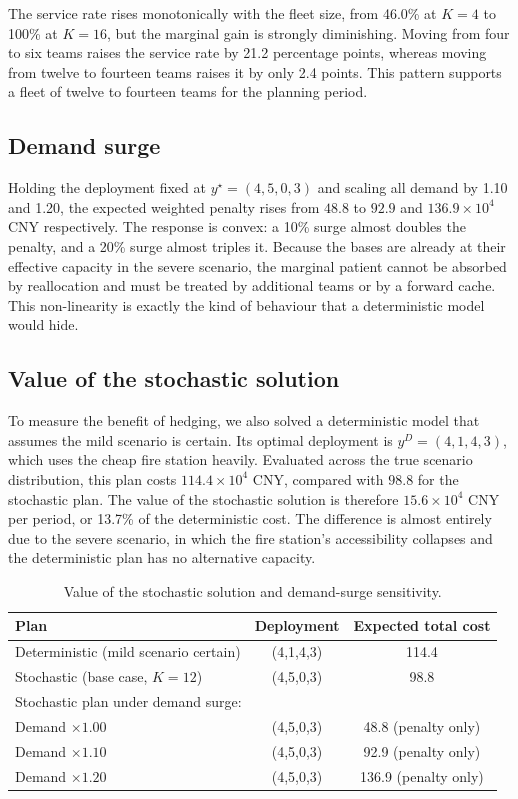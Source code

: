\documentclass{apmcmthesis}
\begin{document}
The service rate rises monotonically with the fleet size, from 46.0\% at $K=4$ to 100\% at $K=16$, but the marginal gain is strongly diminishing. Moving from four to six teams raises the service rate by 21.2 percentage points, whereas moving from twelve to fourteen teams raises it by only 2.4 points. This pattern supports a fleet of twelve to fourteen teams for the planning period.

\subsection{Demand surge}

Holding the deployment fixed at $y^{\star}=(4,5,0,3)$ and scaling all demand by 1.10 and 1.20, the expected weighted penalty rises from $48.8$ to $92.9$ and $136.9\times10^{4}$ CNY respectively. The response is convex: a 10\% surge almost doubles the penalty, and a 20\% surge almost triples it. Because the bases are already at their effective capacity in the severe scenario, the marginal patient cannot be absorbed by reallocation and must be treated by additional teams or by a forward cache. This non-linearity is exactly the kind of behaviour that a deterministic model would hide.

\subsection{Value of the stochastic solution}

To measure the benefit of hedging, we also solved a deterministic model that assumes the mild scenario is certain. Its optimal deployment is $y^{D}=(4,1,4,3)$, which uses the cheap fire station heavily. Evaluated across the true scenario distribution, this plan costs $114.4\times10^{4}$ CNY, compared with $98.8$ for the stochastic plan. The value of the stochastic solution is therefore $15.6\times10^{4}$ CNY per period, or 13.7\% of the deterministic cost. The difference is almost entirely due to the severe scenario, in which the fire station's accessibility collapses and the deterministic plan has no alternative capacity.

\begin{table}[!ht]
\centering
\caption{Value of the stochastic solution and demand-surge sensitivity.}
\label{tab:vss}
\small
\begin{tabular}{lcc}
\toprule
Plan & Deployment & Expected total cost \\
\midrule
Deterministic (mild scenario certain) & (4,1,4,3) & 114.4 \\
Stochastic (base case, $K=12$)        & (4,5,0,3) & 98.8 \\
\midrule
\multicolumn{3}{l}{Stochastic plan under demand surge:} \\
Demand $\times1.00$ & (4,5,0,3) & 48.8 (penalty only) \\
Demand $\times1.10$ & (4,5,0,3) & 92.9 (penalty only) \\
Demand $\times1.20$ & (4,5,0,3) & 136.9 (penalty only) \\
\bottomrule
\end{tabular}
\end{table}
\end{document}
